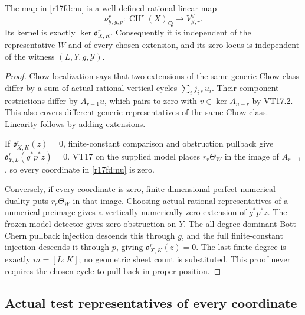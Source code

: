 \begin{lemma}
\label{r17fd:numerical-kernel}
The map in \eqref{r17fd:nu} is a well-defined rational linear
map
\[
 \nu_{\mathcal Y,g,p}^r:
 \operatorname{CH}^r(X)_{\mathbf Q}
                  \longrightarrow V_{\mathcal Y,r}^{\vee}.
\]
Its kernel is exactly $\ker\mathfrak o_{X,K}^r$.
Consequently it is independent of the representative $W$
and of every chosen extension, and its zero locus is
independent of the witness $(L,Y,g,\mathcal Y)$.
\end{lemma}

\begin{proof}
Chow localization says that two extensions of the same
generic Chow class differ by a sum of actual rational
vertical cycles $\sum_i j_{i*}u_i$. Their component
restrictions differ by $A_{r-1}u$, which pairs to zero
with $v\in\ker A_{n-r}$ by VT17.2. This also covers
different generic representatives of the same Chow class.
Linearity follows by adding extensions.

If $\mathfrak o_{X,K}^r(z)=0$, finite-constant comparison
and obstruction pullback give
$\mathfrak o_{Y,L}^r(g^*p^*z)=0$. VT17 on the supplied
model places $r_r\Theta_W$ in the image of $A_{r-1}$,
so every coordinate in \eqref{r17fd:nu} is zero.

Conversely, if every coordinate is zero, finite-dimensional
perfect numerical duality puts $r_r\Theta_W$ in that
image. Choosing actual rational representatives of a
numerical preimage gives a vertically numerically zero
extension of $g^*p^*z$. The frozen model detector gives
zero obstruction on $Y$. The all-degree dominant
Bott--Chern pullback injection descends this through $g$,
and the full finite-constant injection descends it through
$p$, giving $\mathfrak o_{X,K}^r(z)=0$.
The last finite degree is exactly $m=[L:K]$; no
geometric sheet count is substituted. This proof never
requires the chosen cycle to pull back in proper position.
\end{proof}

\subsection{Actual test representatives of every coordinate}

